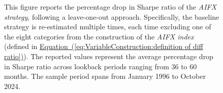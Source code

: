 \documentclass[12pt,oneside,letter]{article}
\newcommand*{\myeq}[1]{\hyperref[{#1}]{Equation~(\ref*{#1})}}
\begin{document}
\begin{landscape}
\begin{figure}
	
	    \begin{small}
	    This figure reports the percentage drop in Sharpe ratio of the \textit{AIFX strategy}, following a leave-one-out approach. Specifically, the baseline strategy is re-estimated multiple times, each time excluding one of the eight categories from the construction of the \textit{AIFX index} (defined in \myeq{eq:VariableConstruction:definition of diff ratio}). The reported values represent the average percentage drop in Sharpe ratio across lookback periods ranging from 36 to 60 months. The sample period spans from January 1996 to October 2024.
	    \end{small}


	\end{figure}

\end{landscape}
\end{document}
